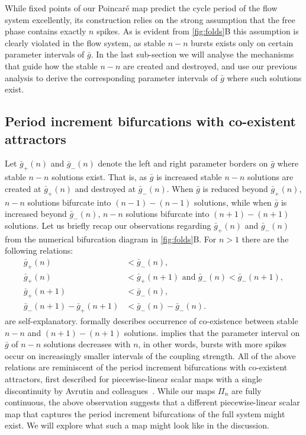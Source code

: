 \documentclass[utf8,draft]{frontiersFPHY} %
\newcommand{\gbar}{\bar g}
\begin{document}
While fixed points of our Poincaré map predict the cycle period of the flow system excellently, its construction relies on the strong assumption that the free phase contains exactly $n$ spikes.
As is evident from \cref{fig:folds}B this assumption is clearly violated in the flow system, as stable $n-n$ bursts exists only on certain parameter intervals of $\gbar$.
In the last sub-section we will analyse the mechanisms that guide how the stable $n-n$ are created and destroyed, and use our previous analysis to derive the corresponding parameter intervals of $\gbar$ where such solutions exist.

\subsection{Period increment bifurcations with co-existent attractors}
Let $\gbar_+(n)$ and $\gbar_-(n)$ denote the left and right parameter borders on $\gbar$ where stable $n-n$ solutions exist.
That is, as $\gbar$ is increased stable $n-n$ solutions are created at $\gbar_+(n)$ and destroyed at $\gbar_-(n)$.
When $\gbar$ is reduced beyond $\gbar_+(n)$, $n-n$ solutions bifurcate into $(n-1)-(n-1)$ solutions, while when $\gbar$ is increased beyond $\gbar_-(n)$, $n-n$ solutions bifurcate into $(n+1)-(n+1)$ solutions.
Let us briefly recap our observations regarding $\gbar_+(n)$ and $\gbar_-(n)$ from the numerical bifurcation diagram in \cref{fig:folds}B.
For $n>1$ there are the following relations:
\begin{align}
  \gbar_+(n) &< \gbar_-(n)\label{eq:easy1},\\
  \gbar_+(n) &< \gbar_+(n+1)\text{ and } \gbar_-(n)<\gbar_-(n+1)\label{eq:easy2},\\
  \gbar_+(n+1) &< \gbar_-(n)\label{eq:coexistence},\\
  \gbar_-(n+1) - \gbar_+(n+1) &< \gbar_-(n) - \gbar_-(n)\label{eq:robustness}.
\end{align}
 are self-explanatory.
 formally describes occurrence of co-existence between stable $n-n$ and $(n+1)-(n+1)$ solutions.
 implies that the parameter interval on $\gbar$ of $n-n$ solutions decreases with $n$, in other words, bursts with more spikes occur on increasingly smaller intervals of the coupling strength.
All of the above relations are reminiscent of the period increment bifurcations with co-existent attractors, first described for piecewise-linear scalar maps with a single discontinuity by Avrutin and colleagues~\cite[e.g. see][]{gardini2012,tramontana2012,avrutin2011,gardini2012}.
While our maps $\Pi_n$ are fully continuous, the above observation suggests that
a different piecewise-linear scalar map that captures the period increment bifurcations of the full system might exist.
We will explore what such a map might look like in the discussion.
\end{document}
